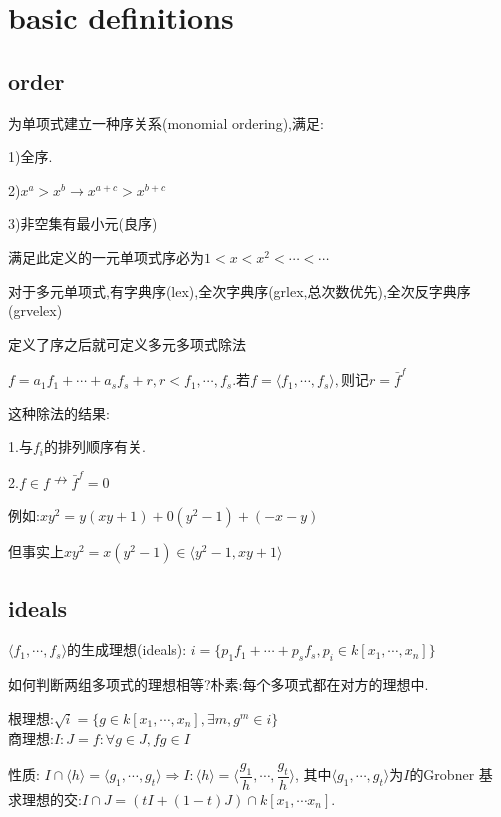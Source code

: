 
\section{basic definitions}
\subsection{order}
为单项式建立一种序关系(monomial ordering),满足:

1)全序.

2)$ x^a>x^b\rightarrow x^{a+c}>x^{b+c}$

3)非空集有最小元(良序)

满足此定义的一元单项式序必为$ 1<x<x^2<\cdots<\cdots$

对于多元单项式,有字典序(lex),全次字典序(grlex,总次数优先),全次反字典序(grvelex)

定义了序之后就可定义多元多项式除法

$ f=a_1f_1+\cdots+a_sf_s+r,r<f_1,\cdots,f_s$.若$ f=\langle f_1,\cdots,f_s \rangle,$则记$ r=\bar{f}^{f}$

这种除法的结果:

1.与$ f_i$的排列顺序有关.

2.$ f\in f \nrightarrow \bar{f}^f=0$

例如:$ xy^2=y(xy+1)+0(y^2-1)+(-x-y)$

但事实上$ xy^2=x(y^2-1)\in \langle y^2-1,xy+1 \rangle$


\subsection{ideals}
$ \langle f_1,\cdots,f_s \rangle$的生成理想(ideals): 
$ i=\{p_1f_1+\cdots+p_sf_s,p_i\in k[x_1,\cdots,x_n]\}$

如何判断两组多项式的理想相等?朴素:每个多项式都在对方的理想中.

根理想:$ \sqrt{i}=\{g\in k[x_1,\cdots,x_n],\exists m,g^m\in i \}$
\\

商理想:$ I:J={f: \forall g \in J,fg\in I }$

性质: $ I\cap \langle h \rangle =\langle g_1,\cdots,g_t \rangle\Rightarrow I:\langle h \rangle=\langle \dfrac{g_1}{h},\cdots,\dfrac{g_t}{h} \rangle$,
其中$ \langle g_1,\cdots,g_t \rangle $为$ I$的Grobner 基
\\

求理想的交:$ I\cap J=(tI+(1-t)J)\cap k[x_1,\cdots x_n]$.

